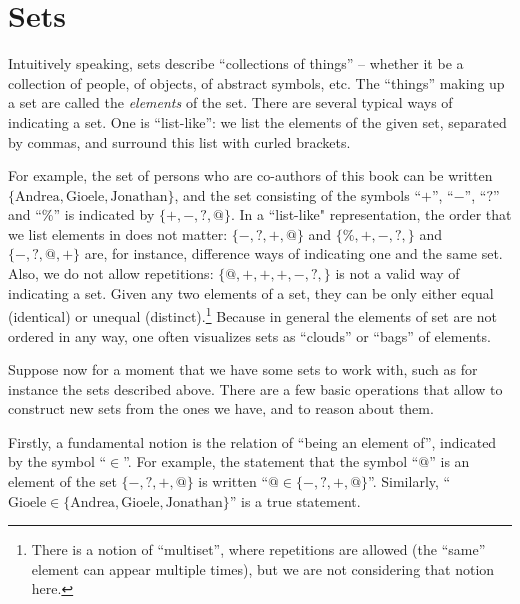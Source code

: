 

\section{Sets}


Intuitively speaking, sets describe ``collections of things'' -- whether it be a collection of people, of objects, of abstract symbols, etc.
The ``things'' making up a set are called the \emph{elements} of the set.
There are several typical ways of indicating a set. One is ``list-like'':
we list the elements of the given set, separated by commas, and surround this list with curled brackets.


For example, the set of persons who are co-authors of this book can be written $\{ \text{Andrea}, \text{Gioele}, \text{Jonathan} \}$, and the set consisting of the symbols ``$+$'', ``$-$'', ``$?$'' and ``$\%$'' is indicated by $\{ +, -, ?, @ \}$. In a ``list-like" representation, the order that we list elements in does not matter: $\{ -, ?, +, @ \}$ and $\{ \%, +, -, ?, \}$ and $\{ -, ?, @, + \}$ are, for instance, difference ways of indicating one and the same set. Also, we do not allow repetitions: $\{ @, +, +, +, -, ?, \}$ is not a valid way of indicating a set. Given any two elements of a set, they can be only either equal (identical) or unequal (distinct).\footnote{There is a notion of ``multiset'', where repetitions are allowed (the ``same'' element can appear multiple times), but we are not considering that notion here.} Because in general the elements of set are not ordered in any way, one often visualizes sets as ``clouds'' or ``bags'' of elements.


Suppose now for a moment that we have some sets to work with, such as for instance the sets described above.
There are a few basic operations that allow to construct new sets from the ones we have, and to reason about them.


Firstly, a fundamental notion is the relation of ``being an element of'', indicated by the symbol ``$\in$''.
For example, the statement that the symbol ``$@$'' is an element of the set $\{ -, ?, +, @ \}$ is written ``$@ \in \{ -, ?, +, @ \}$''.
Similarly, ``$\text{Gioele} \in \{ \text{Andrea}, \text{Gioele}, \text{Jonathan} \}$'' is a true statement.

